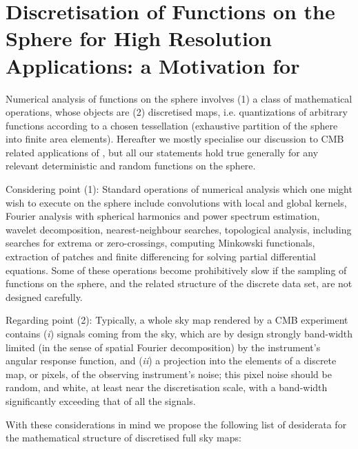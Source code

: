 \documentclass[12pt,twoside]{article}
\begin{document}
\section[Discretisation of Functions on the Sphere]{Discretisation of Functions on the Sphere for 
High Resolution Applications:
a Motivation for \healpix}

Numerical analysis of functions on the sphere involves 
(1) a class of mathematical operations, whose objects are 
(2) discretised maps, i.e. quantizations of arbitrary functions 
according to a
chosen tessellation (exhaustive partition of the sphere into 
finite area elements). Hereafter we mostly specialise our discussion 
to CMB related applications of
\healpixns, 
but all our statements hold true generally for any relevant 
deterministic and random functions on the sphere.

Considering point (1):
Standard operations of numerical analysis which one might wish to
execute on the sphere include
convolutions with local and global kernels, 
Fourier analysis with spherical harmonics
and power spectrum estimation,
wavelet decomposition, nearest-neighbour searches, topological
analysis, including searches for extrema or zero-crossings, 
computing Minkowski functionals,
extraction of patches and
finite differencing for solving partial
differential equations.
Some of these operations become prohibitively slow  
if the sampling of functions on the sphere, and the related structure of 
the discrete data set, are not designed carefully. 

Regarding point (2): 
Typically, a whole sky map rendered by a CMB experiment contains 
({\it i}) signals coming from the sky,
which are by design strongly band-width limited (in the sense of 
spatial Fourier
decomposition) by the instrument's angular response 
function, and 
({\it ii}) a projection into the elements of a discrete map, or pixels,
of the observing instrument's noise; this pixel noise should be random,
and white, at least near the discretisation scale, with a band-width 
significantly exceeding that of all the signals. 

With these considerations in mind we propose the following list of 
desiderata 
for the mathematical structure of discretised full sky maps:
\end{document}

